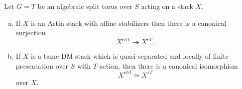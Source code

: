 \begin{theorem}\label{rl-001G}\label{thm:reconciliation-of-fixed-stacks-for-tori}
  Let \(G = T\) be an algebraic split torus over \(S\) acting on a stack \(X\).
  \begin{enumerate}[(a)]
    \item If \(X\) is an Artin stack with affine stabilizers then there is a canonical surjection
          \[X^{rhT}\twoheadrightarrow X^{eT}.\]
    \item If \(X\) is a tame DM stack which is quasi-separated and locally of finite presentation over \(S\) with \(T\)-action, then there is a canonical isomorphism
          \[X^{rhT} \simeq X^{sT}\]
    over \(X\).
  \end{enumerate}

\end{theorem}
